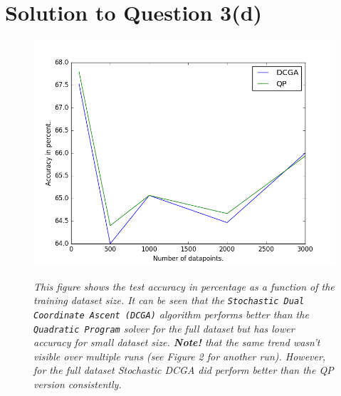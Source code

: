 \documentclass[a4paper,11pt]{article}
\begin{document}
\section*{Solution to Question 3(d)}
\begin{figure}[ht]
    \centering
    \includegraphics[width=1.1\linewidth]{figure_11.png}
    \label{fig:f11}
    \caption{\textit{This figure shows the test accuracy in percentage as a function of the training dataset size. It can be seen that the \texttt{Stochastic Dual Coordinate Ascent (DCGA)}
    algorithm performs better than the \texttt{Quadratic Program} solver for the full dataset but has lower accuracy for small dataset size. \textbf{Note!} that the same trend wasn't visible over multiple runs (see Figure 2 for another run). However, for the full dataset Stochastic DCGA did perform better than the QP version consistently. 
    }}
\end{figure}
\end{document}
